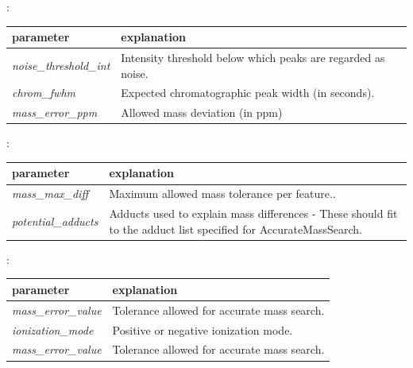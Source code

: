 \noindent{}:
\begin{center}
\begin{tabular*}{\textwidth}{ p{5.5cm}|p{10.5cm} }
\textbf{parameter} & \textbf{explanation} \\ \hline
\textit{noise\_threshold\_int} & Intensity threshold below which peaks are regarded as noise. \\
\textit{chrom\_fwhm} & Expected chromatographic peak width (in seconds). \\
\textit{mass\_error\_ppm} & Allowed mass deviation (in ppm) \\
\end{tabular*}
\end{center}

\noindent{}:
\begin{center}
\begin{tabular*}{\textwidth}{ p{5.5cm}|p{10.5cm} }
\textbf{parameter} & \textbf{explanation} \\ \hline
\textit{mass\_max\_diff} & Maximum allowed mass tolerance per feature.. \\
\textit{potential\_adducts} & Adducts used to explain mass differences - These should fit to the adduct list specified for AccurateMassSearch. \\
\end{tabular*}
\end{center}

\noindent{}:
\begin{center}
\begin{tabular*}{\textwidth}{ p{5.5cm}|p{10.5cm} }
\textbf{parameter} & \textbf{explanation} \\ \hline
\textit{mass\_error\_value} & Tolerance allowed for accurate mass search. \\
\textit{ionization\_mode} &  Positive or negative ionization mode. \\
\textit{mass\_error\_value} & Tolerance allowed for accurate mass search. \\
\end{tabular*}
\end{center}

